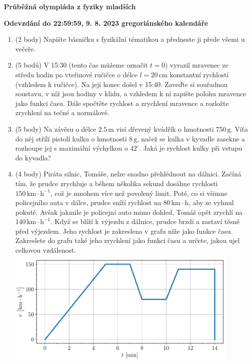 \documentclass[12pt,a4paper]{article}
\begin{document}
\newpage
\begin{center}
    \textbf{\Large Průběžná olympiáda z fyziky mladších}
    \vspace{1em}
    
    \textbf{Odevzdání do 22:59:59, 9. 8. 2023 gregoriánského kalendáře}
\end{center}

\begin{enumerate}[resume,label=\arabic*)]

\item (2 body)
Napište básničku s fyzikální tématikou a předneste ji přede všemi u večeře.

\item (5 bodů)
V 15:30 (tento čas můžeme označit $t = 0$) vyrazil mravenec ze středu hodin po vteřinové ručičce o délce $l = 20\,\mathrm{cm}$ konstantní rychlostí (vzhledem k ručičce). Na její konec došel v 15:40. Zaveďte si souřadnou soustavu, v níž jsou hodiny v klidu, a vzhledem k ní zapište polohu mravence jako funkci času. Dále spočtěte rychlost a zrychlení mravence a rozložte zrychlení na tečné a normálové.

\item (5 body)
Na závěsu o délce $2.5\,\mathrm{m}$ visí dřevený kvádřík o hmotnosti $750\,\mathrm{g}$. Víťa do něj střílí pistolí kulku o hmotnosti $8\,\mathrm{g}$, načež se kulka v kyvadle zasekne a rozhoupe jej s maximální výchylkou o $42^\circ$. Jaká je rychlost kulky při vstupu do kyvadla?

\item (4 body)
Piráta silnic, Tomáše, nelze snadno přehlédnout na dálnici. Začíná tím, že prudce zrychluje a během několika sekund dosáhne rychlosti $150\,\mathrm{km}\cdot\mathrm{h}^{-1}$, což je mnohem více než povolený limit. Poté, co si všimne policejního auta v dálce, prudce sníží rychlost na $80\,\mathrm{km}\cdot\mathrm{h}$, aby se vyhnul pokutě. Avšak jakmile je policejní auto mimo dohled, Tomáš opět zrychlí na $140\,\mathrm{km}\cdot\mathrm{h}^{-1}$. Když se blíží k výjezdu z dálnice, prudce brzdí a zastaví těsně před výjezdem. Jeho rychlost je zakreslena v grafu níže jako funkce času. Zakreslete do grafu také jeho zrychlení jako funkci času a určete, jakou ujel celkovou vzdálenost.
\includegraphics[width=0.9\textwidth]{tomas.pdf}


\end{enumerate}
\end{document}

